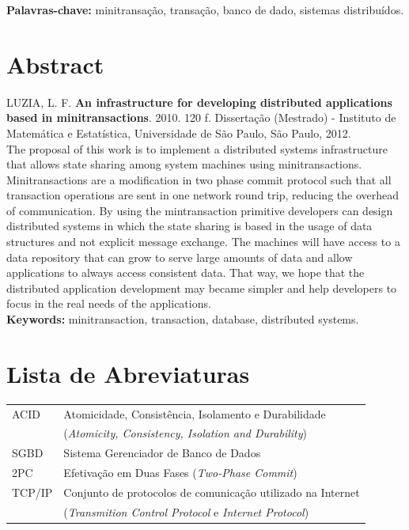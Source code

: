 \documentclass[11pt,twoside,a4paper]{book}
\begin{document}
\noindent \textbf{Palavras-chave:} minitransação, transação, banco de dado, sistemas distribuídos.

\chapter*{Abstract}
\noindent LUZIA, L. F. \textbf{An infrastructure for developing distributed applications based in minitransactions}. 
2010. 120 f.
Dissertação (Mestrado) - Instituto de Matemática e Estatística,
Universidade de São Paulo, São Paulo, 2012.
\\

The proposal of this work is to implement a distributed systems infrastructure that allows state sharing among system machines using minitransactions. Minitransactions are a modification in two phase commit protocol such that all transaction operations are sent in one network round trip, reducing the overhead of communication. By using the mintransaction primitive developers can design distributed systems in which the state sharing is based in the usage of data structures and not explicit message exchange. The machines will have access to a data repository that can grow to serve large amounts of data and allow applications to always access consistent data. That way, we hope that the distributed application development may became simpler and help developers to focus in the real needs of the applications.
\\

\noindent \textbf{Keywords:} minitransaction, transaction, database, distributed systems.

\tableofcontents

\chapter{Lista de Abreviaturas}
\begin{tabular}{ll}
	ACID    & Atomicidade, Consistência, Isolamento e Durabilidade \\
            & (\emph{Atomicity, Consistency, Isolation and Durability})\\
    SGBD	& Sistema Gerenciador de Banco de Dados\\
	2PC		& Efetivação em Duas Fases (\emph{Two-Phase Commit})\\
	TCP/IP	& Conjunto de protocolos de comunicação utilizado na Internet\\
			& (\emph{Transmition Control Protocol} e \emph{Internet Protocol})\\
\end{tabular}
\end{document}
